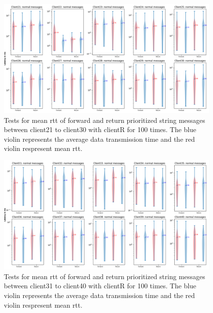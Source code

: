 \begin{figure}
    \includegraphics[width=\textheight]{figures/appendix/priority_tests/log_violin_50clients_string_figure_3.png}\hfill 
    \caption{Tests for mean \gls{rtt} of forward and return prioritized string messages between client21 to client30 
    with clientR for 100 times. The blue violin represents the average data transmission time and the red violin 
    respresent mean \gls{rtt}.} \label{fig: priority-50clients-string-c}
\end{figure}

\begin{figure}
    \includegraphics[width=\textheight]{figures/appendix/priority_tests/log_violin_50clients_string_figure_4.png}\hfill 
    \caption{Tests for mean \gls{rtt} of forward and return prioritized string messages between client31 to client40 
    with clientR for 100 times. The blue violin represents the average data transmission time and the red violin 
    respresent mean \gls{rtt}.} \label{fig: priority-50clients-string-d}
\end{figure}

